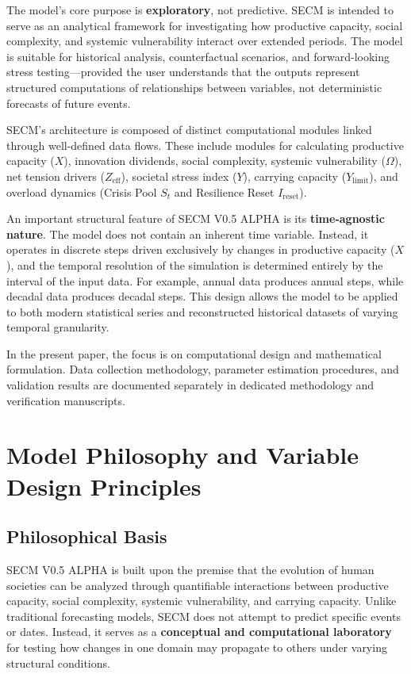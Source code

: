 \documentclass[12pt,a4paper]{article}
\begin{document}
The model’s core purpose is \textbf{exploratory}, not predictive. SECM is intended to serve as an analytical framework for investigating how productive capacity, social complexity, and systemic vulnerability interact over extended periods. The model is suitable for historical analysis, counterfactual scenarios, and forward-looking stress testing---provided the user understands that the outputs represent structured computations of relationships between variables, not deterministic forecasts of future events.

SECM’s architecture is composed of distinct computational modules linked through well-defined data flows. These include modules for calculating productive capacity (\(X\)), innovation dividends, social complexity, systemic vulnerability (\(\Omega\)), net tension drivers (\(Z_{\mathrm{eff}}\)), societal stress index (\(Y\)), carrying capacity (\(Y_{\mathrm{limit}}\)), and overload dynamics (Crisis Pool \(S_t\) and Resilience Reset \(I_{\mathrm{reset}}\)).

An important structural feature of SECM V0.5 ALPHA is its \textbf{time-agnostic nature}. The model does not contain an inherent time variable. Instead, it operates in discrete steps driven exclusively by changes in productive capacity (\(X\)), and the temporal resolution of the simulation is determined entirely by the interval of the input data. For example, annual data produces annual steps, while decadal data produces decadal steps. This design allows the model to be applied to both modern statistical series and reconstructed historical datasets of varying temporal granularity.

In the present paper, the focus is on computational design and mathematical formulation. Data collection methodology, parameter estimation procedures, and validation results are documented separately in dedicated methodology and verification manuscripts.
\section{Model Philosophy and Variable Design Principles}

\subsection{Philosophical Basis}
SECM V0.5 ALPHA is built upon the premise that the evolution of human societies can be analyzed through quantifiable interactions between productive capacity, social complexity, systemic vulnerability, and carrying capacity. Unlike traditional forecasting models, SECM does not attempt to predict specific events or dates. Instead, it serves as a \textbf{conceptual and computational laboratory} for testing how changes in one domain may propagate to others under varying structural conditions.
\end{document}
